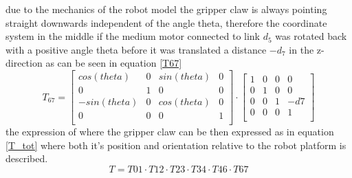 due to the mechanics of the robot model the gripper claw is always pointing straight downwards independent of the angle theta, therefore the coordinate system in the middle if the medium motor connected to link \(d_5\) was rotated back with a positive angle theta before it was translated a distance \(-d_7\) in the z-direction as can be seen in equation \ref{T67}
\begin{equation}
    T_{67} =
    \begin{bmatrix}
    cos(theta)&0&sin(theta)&0\\
    0&1&0&0\\
    -sin(theta)&0&cos(theta)&0\\
    0&0&0&1\\
    \end{bmatrix}
    \cdot
     \begin{bmatrix}
    1&0&0&0\\
    0&1&0&0\\
    0&0&1&-d7\\
    0&0&0&1\\
    \end{bmatrix}
    \label{T67}
\end{equation}
the expression of where the gripper claw can be then expressed as in equation \ref{T_tot} where both it's position and orientation relative to the robot platform is described.
\begin{equation}
    T = T01\cdot T12\cdot T23 \cdot T34 \cdot T46 \cdot T67
    \label{T_tot}
\end{equation}
